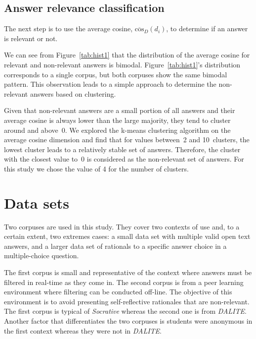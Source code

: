 \documentclass{edm_template}
\newcommand{\dalite}{DALITE}
\begin{document}
\subsection{Answer relevance classification}

The next step is to use the average cosine, $\overline{\textrm{cos}}_D(d_i)$, to determine if an answer is relevant or not.

We can see from Figure~\ref{tab:hist1} that the distribution of the average cosine for relevant and non-relevant answers is bimodal. Figure~\ref{tab:hist1}'s distribution corresponds to a single corpus, but both corpuses show the same bimodal pattern.  This observation leads to a simple approach to determine the non-relevant answers based on clustering.  

Given that non-relevant answers are a small portion of all answers and their average cosine is always lower than the large majority, they tend to cluster around and above~0.  We explored the k-means clustering algorithm on the average cosine dimension and find that for values between~2 and 10~clusters, the lowest cluster leads to a relatively stable set of answers.  Therefore, the cluster with the closest value to~0 is considered as the non-relevant set of answers.  For this study we chose the value of 4 for the number of clusters.


\section{Data sets}

Two corpuses are used in this study.  They cover two contexts of use and, to a certain extent, two extremes cases: a small data set with multiple valid open text answers, and a larger data set of rationals to a specific answer choice in a multiple-choice question.

The first corpus is small and representative of the context where answers must be filtered in real-time as they come in.  The second corpus is from a peer learning environment where filtering can be conducted off-line.  The objective of this environment is to avoid presenting self-reflective rationales that are non-relevant.  The first corpus is typical of \textit{Socrative} whereas the second one is from \textit{\dalite}.  Another factor that differentiates the two corpuses is students were anonymous in the first context whereas they were not in \textit{\dalite}.
\end{document}
